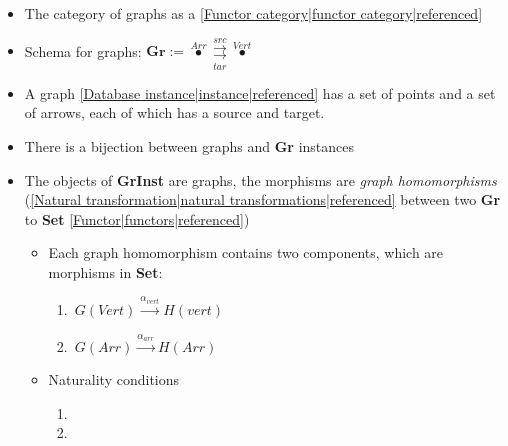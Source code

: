 
\begin{itemize}
    \item The category of graphs as a \ref{Functor category|functor category|referenced}
    \item Schema for graphs: $\mathbf{Gr}:=\boxed{\overset{Arr}\bullet \overset{src}{\underset{tar}{\rightrightarrows}}\overset{Vert}\bullet}$
    \item A graph \ref{Database instance|instance|referenced} has a set of points and a set of arrows, each of which has a source and target.
    \item There is a bijection between graphs and \textbf{Gr} instances
    \item The objects of \textbf{GrInst} are graphs, the morphisms are \emph{graph homomorphisms} (\ref{Natural transformation|natural transformations|referenced} between two \textbf{Gr} to \textbf{Set} \ref{Functor|functors|referenced})
          \begin{itemize}
            \item Each graph homomorphism contains two components, which are morphisms in \textbf{Set}:
                  \begin{enumerate}
                    \item \,$G(Vert) \xrightarrow{\alpha_{vert}} H(vert)$\,
                    \item \,$G(Arr) \xrightarrow{\alpha_{arr}} H(Arr)$\,
                  \end{enumerate}
            \item Naturality conditions
                  \begin{enumerate}
                    \item {}
                    \item {}
                  \end{enumerate}
          \end{itemize}
  \end{itemize}
